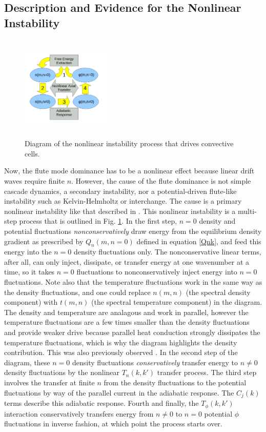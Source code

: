 \documentclass[twocolumn,showpacs,preprintnumbers,amsmath,amssymb]{revtex4}
\begin{document}
\subsection{Description and Evidence for the Nonlinear Instability}

\begin{figure}
\includegraphics[width=0.38\textwidth,height=50mm]{nl_instability_diagram}
\hfil
\caption{Diagram of the nonlinear instability process that drives convective cells.}
\label{nl_instability_diagram}
\end{figure}

Now, the flute mode dominance has to be a nonlinear effect because linear drift waves require finite $n$. However, the cause of the flute dominance is not simple cascade dynamics, a secondary 
instability, nor a potential-driven flute-like instability such as Kelvin-Helmholtz or interchange. The cause is a primary nonlinear instability like that described in \cite{biskamp1995,drake1995}. 
This nonlinear instability is a multi-step process that is outlined in Fig. \ref{nl_instability_diagram}.
In the first step, $n=0$ density and potential fluctuations \emph{nonconservatively} draw energy from the equilibrium density gradient as prescribed by $Q_n(m,n=0)$ defined in equation \ref{Qnk}, and feed
this energy into the $n=0$ density fluctuations only. The nonconservative linear terms, after all, can only inject, dissipate, or transfer energy at one wavenumber at a time, so it takes
$n=0$ fluctuations to nonconservatively inject energy into $n=0$ fluctuations.
Note also that the temperature fluctuations work in the same way as the density fluctuations, and one could replace $n(m,n)$ (the spectral density component)
with $t(m,n)$ (the spectral temperature component) in the diagram. The density and temperature are analagous and work in parallel, however the temperature fluctuations are a few times smaller
than the density fluctuations and provide weaker drive because parallel heat conduction strongly dissipates the temperature fluctuations, which is why the diagram highlights the density contribution.
This was also previously observed \cite{zeiler1997}.
In the second step of the diagram, these $n=0$ density fluctuations
\emph{conservatively} transfer energy to $n \ne 0$ density fluctuations by the nonlinear $T_n(k,k')$ transfer process. The third step involves the transfer at finite $n$ from the density
fluctuations to the potential fluctuations by way of the parallel current in the adiabatic response. The $C_j(k)$ terms describe this adiabatic response.
Fourth and finally, the $T_\phi(k,k')$ interaction conservatively transfers energy from
$n \ne 0$ to $n=0$ potential $\phi$ fluctuations in inverse fashion, at which point the process starts over. 
\end{document}
